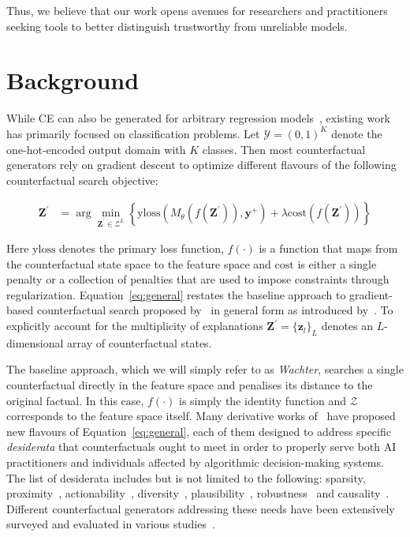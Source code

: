 \documentclass{article}
\begin{document}
Thus, we believe that our work opens avenues for researchers and practitioners seeking tools to better distinguish trustworthy from unreliable models.

\section{Background}\label{background}

While CE can also be generated for arbitrary regression models~\citep{spooner2021counterfactual}, existing work has primarily focused on classification problems. Let $\mathcal{Y}=(0,1)^K$ denote the one-hot-encoded output domain with $K$ classes. Then most counterfactual generators rely on gradient descent to optimize different flavours of the following counterfactual search objective:

\begin{equation} \label{eq:general}
\begin{aligned}
\mathbf{Z}^\prime &= \arg \min_{\mathbf{Z}^\prime \in \mathcal{Z}^L} \left\{  {\text{yloss}(M_{\theta}(f(\mathbf{Z}^\prime)),\mathbf{y}^+)}+ \lambda {\text{cost}(f(\mathbf{Z}^\prime)) }  \right\} 
\end{aligned} 
\end{equation}

Here $\text{yloss}$ denotes the primary loss function, $f(\cdot)$ is a function that maps from the counterfactual state space to the feature space and $\text{cost}$ is either a single penalty or a collection of penalties that are used to impose constraints through regularization. Equation~\ref{eq:general} restates the baseline approach to gradient-based counterfactual search proposed by~\citet{wachter2017counterfactual} in general form as introduced by~\citet{altmeyer2023endogenous}. To explicitly account for the multiplicity of explanations $\mathbf{Z}^\prime=\{ \mathbf{z}_l\}_L$ denotes an $L$-dimensional array of counterfactual states. 

The baseline approach, which we will simply refer to as \textit{Wachter}, searches a single counterfactual directly in the feature space and penalises its distance to the original factual. In this case, $f(\cdot)$ is simply the identity function and $\mathcal{Z}$ corresponds to the feature space itself. Many derivative works of~\citet{wachter2017counterfactual} have proposed new flavours of Equation~\ref{eq:general}, each of them designed to address specific \textit{desiderata} that counterfactuals ought to meet in order to properly serve both AI practitioners and individuals affected by algorithmic decision-making systems. The list of desiderata includes but is not limited to the following: sparsity, proximity~\citep{wachter2017counterfactual}, actionability~\citep{ustun2019actionable}, diversity~\citep{mothilal2020explaining}, plausibility~\citep{joshi2019realistic,poyiadzi2020face,schut2021generating}, robustness~\citep{upadhyay2021robust,pawelczyk2022probabilistically,altmeyer2023endogenous} and causality~\citep{karimi2021algorithmic}. Different counterfactual generators addressing these needs have been extensively surveyed and evaluated in various studies~\citep{verma2020counterfactual,karimi2020survey,pawelczyk2021carla,artelt2021evaluating,guidotti2022counterfactual}. 
\end{document}

